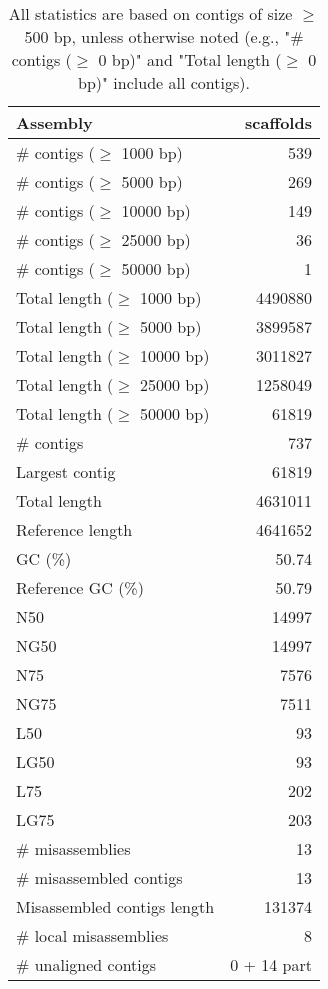 \documentclass[12pt,a4paper]{article}
\begin{document}
\begin{table}[ht]
\begin{center}
\caption{All statistics are based on contigs of size $\geq$ 500 bp, unless otherwise noted (e.g., "\# contigs ($\geq$ 0 bp)" and "Total length ($\geq$ 0 bp)" include all contigs).}
\begin{tabular}{|l*{1}{|r}|}
\hline
Assembly & scaffolds \\ \hline
\# contigs ($\geq$ 1000 bp) & 539 \\ \hline
\# contigs ($\geq$ 5000 bp) & 269 \\ \hline
\# contigs ($\geq$ 10000 bp) & 149 \\ \hline
\# contigs ($\geq$ 25000 bp) & 36 \\ \hline
\# contigs ($\geq$ 50000 bp) & 1 \\ \hline
Total length ($\geq$ 1000 bp) & 4490880 \\ \hline
Total length ($\geq$ 5000 bp) & 3899587 \\ \hline
Total length ($\geq$ 10000 bp) & 3011827 \\ \hline
Total length ($\geq$ 25000 bp) & 1258049 \\ \hline
Total length ($\geq$ 50000 bp) & 61819 \\ \hline
\# contigs & 737 \\ \hline
Largest contig & 61819 \\ \hline
Total length & 4631011 \\ \hline
Reference length & 4641652 \\ \hline
GC (\%) & 50.74 \\ \hline
Reference GC (\%) & 50.79 \\ \hline
N50 & 14997 \\ \hline
NG50 & 14997 \\ \hline
N75 & 7576 \\ \hline
NG75 & 7511 \\ \hline
L50 & 93 \\ \hline
LG50 & 93 \\ \hline
L75 & 202 \\ \hline
LG75 & 203 \\ \hline
\# misassemblies & 13 \\ \hline
\# misassembled contigs & 13 \\ \hline
Misassembled contigs length & 131374 \\ \hline
\# local misassemblies & 8 \\ \hline
\# unaligned contigs & 0 + 14 part \\ \hline

\end{tabular}
\end{center}
\end{table}
\end{document}
